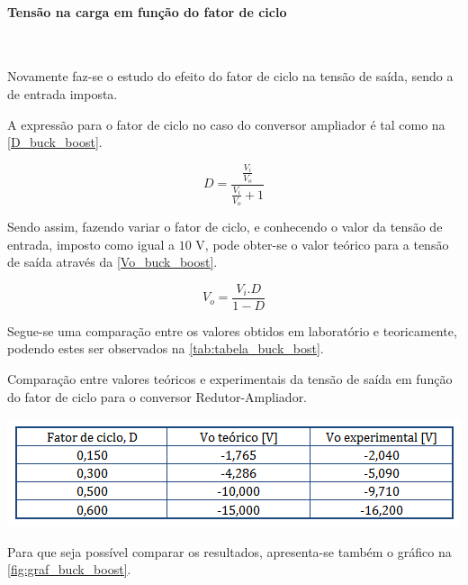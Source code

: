 \documentclass[a4paper,11pt]{article}
\numberwithin{equation}{section}
\begin{document}
\paragraph{Tensão na carga em função do fator de ciclo}\mbox{}\

Novamente faz-se o estudo do efeito do fator de ciclo na tensão de saída, sendo a de entrada imposta.

A expressão para o fator de ciclo no caso do conversor ampliador é tal como na \autoref{D_buck_boost}.

\begin{equation}
D = \frac{\frac{V_i}{V_o}}{\frac{V_i}{V_o} + 1} \label{D_buck_boost}
\end{equation}

Sendo assim, fazendo variar o fator de ciclo, e conhecendo o valor da tensão de entrada, imposto como igual a $10$ V, pode obter-se o valor teórico para a tensão de saída através da \autoref{Vo_buck_boost}.

\begin{equation}
V_o = \frac{V_i.D}{1-D} \label{Vo_buck_boost}
\end{equation}

Segue-se uma comparação entre os valores obtidos em laboratório e teoricamente, podendo estes ser observados na \autoref{tab:tabela_buck_bost}.

\begin{table}[!htb]
	\centering
	\caption{Comparação entre valores teóricos e experimentais da tensão de saída em função do fator de ciclo para o conversor Redutor-Ampliador.}
	\includegraphics[width=0.8\linewidth]{teoricas/tabela_buck_boost}
	\label{tab:tabela_buck_bost}
\end{table}

Para que seja possível comparar os resultados, apresenta-se também o gráfico na \autoref{fig:graf_buck_boost}.
\end{document}

